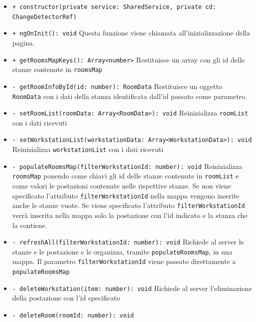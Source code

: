 \begin{itemize}
	\item \texttt{+ constructor(private service: SharedService, private cd: ChangeDetectorRef)} 
	\item \texttt{+ ngOnInit(): void} \newline
	Questa funzione viene chiamata all'inizializzazione della pagina.
	\item \texttt{+ getRoomsMapKeys(): Array<number>} \newline
	Restituisce un array con gli id delle stanze contenute in \texttt{roomsMap}
	\item \texttt{- getRoomInfoById(id: number): RoomData} \newline
	Restituisce un oggetto \texttt{RoomData} con i dati della stanza identificata dall'id passato come parametro.
	\item \texttt{- setRoomList(roomData: Array<RoomData>): void} \newline
	Reinizializza \texttt{roomList} con i dati ricevuti
	\item \texttt{- setWorkstationList(workstationData: Array<WorkstationData>): void} \newline
	Reinizializza \texttt{workstationList} con i dati ricevuti
	\item \texttt{- populateRoomsMap(filterWorkstationId: number): void} 
	Reinizializza \texttt{roomsMap} ponendo come chiavi gli id delle stanze contenute in \texttt{roomList} e come valori le postazioni contenute nelle rispettive stanze. \newline
	Se non viene specificato l'attributo \texttt{filterWorkstationId} nella mappa vengono inserite anche le stanze vuote. \newline
	Se viene specificato l'attributo \texttt{filterWorkstationId} verrà inserita nella mappa solo la postazione con l'id indicato e la stanza che la contiene.
	\item \texttt{- refreshAll(filterWorkstationId: number): void} \newline
	Richiede al server le stanze e le postazione e le organizza, tramite \texttt{populateRoomsMap}, in una mappa. Il parametro \texttt{filterWorkstationId} viene passato direttamente a \texttt{populateRoomsMap}
	\item \texttt{- deleteWorkstation(item: number): void} \newline
	Richiede al server l'eliminazione della postazione con l'id specificato
	\item \texttt{- deleteRoom(roomId: number): void} \newline

\end{itemize}
